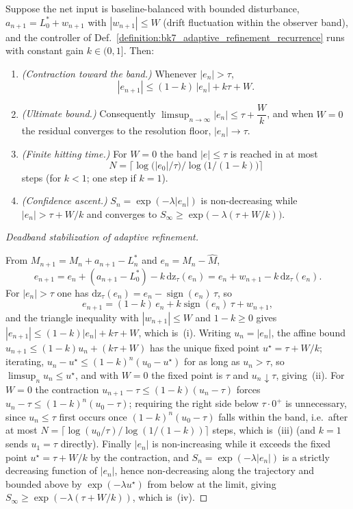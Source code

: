 \begin{theorem}
\label{theorem:bk7_adaptive_refinement_deadband_stabilization}
Suppose the net input is baseline-balanced with bounded disturbance,
$a_{n+1}=L^{\ast}_{0}+w_{n+1}$ with $|w_{n+1}|\le W$ (drift fluctuation within the
observer band), and the controller of
Def.~\ref{definition:bk7_adaptive_refinement_recurrence} runs with constant gain
$k\in(0,1]$. Then:
\begin{enumerate}
\item \emph{(Contraction toward the band.)} Whenever $|e_n|>\tau$,
\[
|e_{n+1}|\le(1-k)\,|e_n|+k\tau+W.
\]
\item \emph{(Ultimate bound.)} Consequently
$\limsup_{n\to\infty}|e_n|\le \tau+\dfrac{W}{k}$, and when $W=0$ the residual
converges to the resolution floor, $|e_n|\to\tau$.
\item \emph{(Finite hitting time.)} For $W=0$ the band $|e|\le\tau$ is reached in at most
\[
N=\big\lceil \log\!\big(|e_0|/\tau\big)\big/\log\!\big(1/(1-k)\big)\big\rceil
\]
steps (for $k<1$; one step if $k=1$).
\item \emph{(Confidence ascent.)} $S_n=\exp(-\lambda|e_n|)$ is non-decreasing while
$|e_n|>\tau+W/k$ and converges to $S_\infty\ge\exp\!\big(-\lambda(\tau+W/k)\big)$.
\end{enumerate}
\end{theorem}

\begin{proof}[Deadband stabilization of adaptive refinement]
\label{proof:bk7_adaptive_refinement_deadband_stabilization}
\leavevmode

From $M_{n+1}=M_n+a_{n+1}-L^{\ast}_n$ and $e_n=M_n-\hat{M}$,
\[
e_{n+1}=e_n+(a_{n+1}-L^{\ast}_0)-k\,\mathrm{dz}_{\tau}(e_n)
=e_n+w_{n+1}-k\,\mathrm{dz}_{\tau}(e_n).
\]
For $|e_n|>\tau$ one has
$\mathrm{dz}_{\tau}(e_n)=e_n-\operatorname{sign}(e_n)\,\tau$, so
\[
e_{n+1}=(1-k)\,e_n+k\operatorname{sign}(e_n)\,\tau+w_{n+1},
\]
and the triangle inequality with $|w_{n+1}|\le W$ and $1-k\ge 0$ gives
$|e_{n+1}|\le(1-k)|e_n|+k\tau+W$, which is~(i). Writing $u_n=|e_n|$, the affine
bound $u_{n+1}\le(1-k)u_n+(k\tau+W)$ has the unique fixed point
$u^{\star}=\tau+W/k$; iterating, $u_{n}-u^{\star}\le(1-k)^{n}(u_0-u^{\star})$ for as
long as $u_n>\tau$, so $\limsup_n u_n\le u^{\star}$, and with $W=0$ the fixed point
is $\tau$ and $u_n\downarrow\tau$, giving~(ii). For $W=0$ the contraction
$u_{n+1}-\tau\le(1-k)(u_n-\tau)$ forces $u_n-\tau\le(1-k)^{n}(u_0-\tau)$; requiring
the right side below $\tau\!\cdot\!0^{+}$ is unnecessary, since $u_n\le\tau$ first
occurs once $(1-k)^{n}(u_0-\tau)$ falls within the band, i.e.\ after at most
$N=\lceil \log(u_0/\tau)/\log(1/(1-k))\rceil$ steps, which is~(iii) (and $k=1$
sends $u_1=\tau$ directly). Finally $|e_n|$ is non-increasing while it exceeds the
fixed point $u^{\star}=\tau+W/k$ by the contraction, and $S_n=\exp(-\lambda|e_n|)$
is a strictly decreasing function of $|e_n|$, hence non-decreasing along the
trajectory and bounded above by $\exp(-\lambda u^{\star})$ from below at the limit,
giving $S_\infty\ge\exp(-\lambda(\tau+W/k))$, which is~(iv).
\end{proof}

